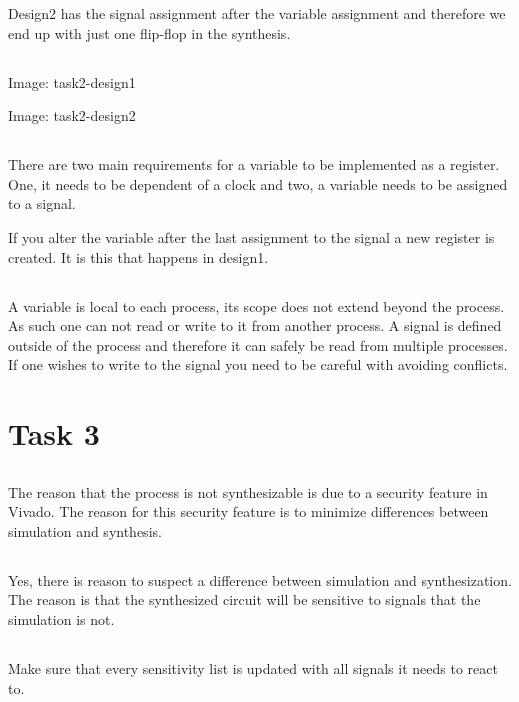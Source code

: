 \documentclass{article}
\begin{document}
Design2 has the signal assignment after the variable assignment and
therefore we end up with just one flip-flop in the synthesis.

\subsection{}
Image: task2-design1

Image: task2-design2

\subsection{}
There are two main requirements for a variable to be implemented as a
register. One, it needs to be dependent of a clock and two, a variable
needs to be assigned to a signal.

If you alter the variable after the last assignment to the signal a
new register is created. It is this that happens in design1.

\subsection{}
A variable is local to each process, its scope does not extend beyond
the process. As such one can not read or write to it from another
process. A signal is defined outside of the process and therefore
it can safely be read from multiple processes. If one wishes to write
to the signal you need to be careful with avoiding conflicts.

\section{Task 3}
\subsection{}
The reason that the process is not synthesizable is due to a security
feature in Vivado. The reason for this security feature is to minimize
differences between simulation and synthesis.

\subsection{}
Yes, there is reason to suspect a difference between simulation and
synthesization. The reason is that the synthesized circuit will be
sensitive to signals that the simulation is not.

\subsection{}
Make sure that every sensitivity list is updated with all signals it
needs to react to.
\end{document}
